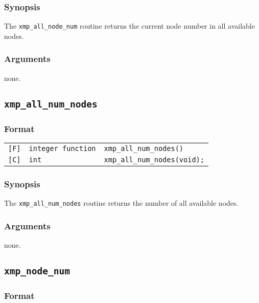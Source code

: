 \subsubsection*{Synopsis}
     The {\tt xmp\_all\_node\_num} routine returns the current node number in all available nodes.


\subsubsection*{Arguments}
    none.

\vspace{0.3cm}

\subsection{\tt xmp\_all\_num\_nodes}

\subsubsection*{Format}

\begin{tabular}{lll}

\verb![F]!&  {\tt integer function}& {\tt xmp\_all\_num\_nodes()}\\

\verb![C]!&  {\tt int}& {\tt xmp\_all\_num\_nodes(void);}

\end{tabular}

\subsubsection*{Synopsis}
     The {\tt xmp\_all\_num\_nodes} routine returns the number of all available nodes.

\subsubsection*{Arguments}
    none.


\vspace{0.3cm}

\subsection{\tt xmp\_node\_num}

\subsubsection*{Format}

